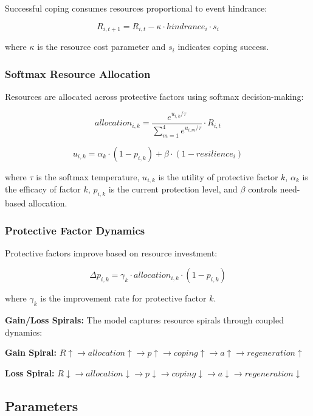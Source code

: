 \documentclass[
  letterpaper,
  DIV=11,
  numbers=noendperiod]{scrartcl}
\begin{document}
Successful coping consumes resources proportional to event hindrance:

\[R_{i,t+1} = R_{i,t} - \kappa \cdot hindrance_i \cdot s_i\]

where \(\kappa\) is the resource cost parameter and \(s_i\) indicates
coping success.

\subsubsection{Softmax Resource
Allocation}\label{softmax-resource-allocation}

Resources are allocated across protective factors using softmax
decision-making:

\[allocation_{i,k} = \frac{e^{u_{i,k}/\tau}}{\sum_{m=1}^4 e^{u_{i,m}/\tau}} \cdot R_{i,t}\]

\[u_{i,k} = \alpha_k \cdot (1 - p_{i,k}) + \beta \cdot (1 - resilience_i)\]

where \(\tau\) is the softmax temperature, \(u_{i,k}\) is the utility of
protective factor \(k\), \(\alpha_k\) is the efficacy of factor \(k\),
\(p_{i,k}\) is the current protection level, and \(\beta\) controls
need-based allocation.

\subsubsection{Protective Factor
Dynamics}\label{protective-factor-dynamics}

Protective factors improve based on resource investment:

\[\Delta p_{i,k} = \gamma_k \cdot allocation_{i,k} \cdot (1 - p_{i,k})\]

where \(\gamma_k\) is the improvement rate for protective factor \(k\).

\textbf{Gain/Loss Spirals:} The model captures resource spirals through
coupled dynamics:

\textbf{Gain Spiral:}
\(R \uparrow \rightarrow allocation \uparrow \rightarrow p \uparrow \rightarrow coping \uparrow \rightarrow a \uparrow \rightarrow regeneration \uparrow\)

\textbf{Loss Spiral:}
\(R \downarrow \rightarrow allocation \downarrow \rightarrow p \downarrow \rightarrow coping \downarrow \rightarrow a \downarrow \rightarrow regeneration \downarrow\)

\subsection{Parameters}\label{parameters}
\end{document}
